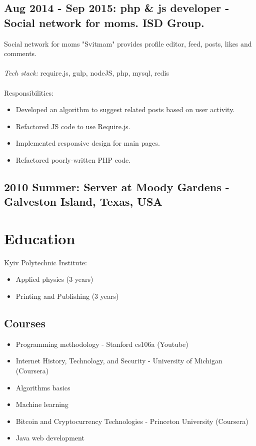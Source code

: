 \documentclass[a4paper, 14pt]{article}
\begin{document}
  \subsection{Aug 2014 - Sep 2015: php \& js developer - Social network for moms. ISD Group.}
    Social network for moms "Svitmam" provides profile editor, feed, posts, likes and comments. \\
  \\
  \textit{Tech stack:} require.js, gulp, nodeJS, php, mysql, redis \\
  \\
  Responsibilities:
  \begin{itemize}
    \item Developed an algorithm to suggest related posts based on user activity. \\
    \item Refactored JS code to use Require.js. \\
    \item Implemented responsive design for main pages. \\
    \item Refactored poorly-written PHP code.
  \end{itemize}

  \subsection{2010 Summer: Server at Moody Gardens - Galveston Island, Texas, USA}

\section{Education}
  Kyiv Polytechnic Institute: 
  \begin{itemize}
    \item Applied physics (3 years) \\
    \item Printing and Publishing (3 years)
  \end{itemize}

  \subsection{Courses}
  \begin{itemize}
    \item Programming methodology - Stanford cs106a (Youtube) \\
    \item Internet History, Technology, and Security - University of Michigan (Coursera) \\
    \item Algorithms basics \\
    \item Machine learning \\
    \item Bitcoin and Cryptocurrency Technologies - Princeton University (Coursera) \\
    \item Java web development
  \end{itemize}
\end{document}
